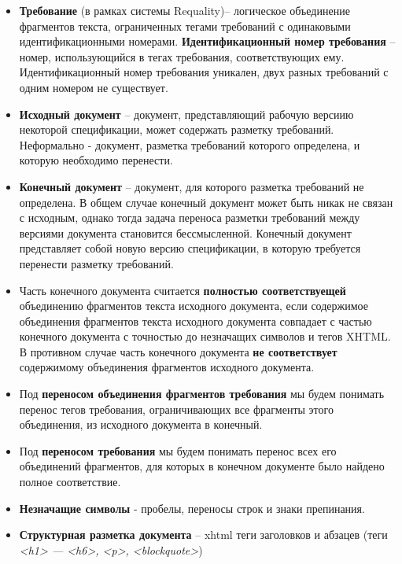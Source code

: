 \begin{itemize}
\item \textbf{Требование} (в рамках системы Requality)– логическое объединение фрагментов текста, ограниченных тегами требований с одинаковыми идентификационными номерами. \textbf{Идентификационный номер требования} – номер, использующийся в тегах требования, соответствующих ему. Идентификационный номер требования уникален, двух разных требований с одним номером не существует.

\item \textbf{Исходный документ} – документ, представляющий рабочую версиию некоторой спецификации, может содержать разметку требований. Неформально - документ, разметка требований которого определена, и которую необходимо перенести.

\item \textbf{Конечный документ} – документ, для которого разметка требований не определена. В общем случае конечный документ может быть никак не связан с исходным, однако тогда задача переноса разметки требований между версиями документа становится бессмысленной. Конечный документ представляет собой новую версию спецификации, в которую требуется перенести разметку требований.

\item Часть конечного документа считается \textbf{полностью соответствуещей} объединению фрагментов текста исходного документа, если содержимое объединения фрагментов текста исходного документа совпадает с частью конечного документа с точностью до незначащих символов и тегов XHTML. В противном случае часть конечного документа \textbf{не соответствует} содержимому объединения фрагментов исходного документа.

\item Под \textbf{переносом объединения фрагментов требования} мы будем понимать перенос тегов требования, ограничивающих все фрагменты этого объединения, из исходного документа в конечный. 

\item Под \textbf{переносом требования} мы будем понимать перенос всех его объединений фрагментов, для которых в конечном документе было найдено полное соответствие. 

\item \textbf{Незначащие символы} - пробелы, переносы строк и знаки препинания.

\item \textbf{Структурная разметка документа} – xhtml теги заголовков и абзацев (теги \emph{<h1> --- <h6>, <p>, <blockquote>})

\end{itemize}